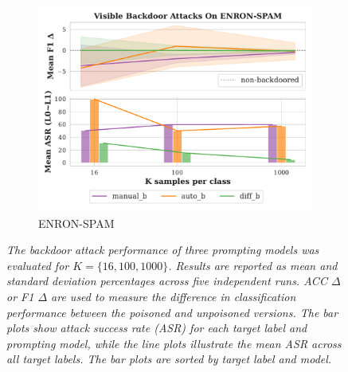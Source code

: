 \begin{figure}[!ht]
\begin{subfigure}{.33\textwidth}
  \includegraphics[width=\linewidth]{figures/evaluation_media/ENRON-SPAM_score_n_attack.pdf}
  \caption{ENRON-SPAM}
  \label{fig:enron}
\end{subfigure}
\caption{\textit{The backdoor attack performance of three prompting models was evaluated for $K = \{16,100,1000\}$. Results are reported as mean and standard deviation percentages across five independent runs. ACC $\Delta$ or F1 $\Delta$ are used to measure the difference in classification performance between the poisoned and unpoisoned versions. The bar plots show attack success rate (ASR) for each target label and prompting model, while the line plots illustrate the mean ASR across all target labels.  The bar plots are sorted by target label and model.}}
\label{fig:score_n_attack_extra}
\end{figure}